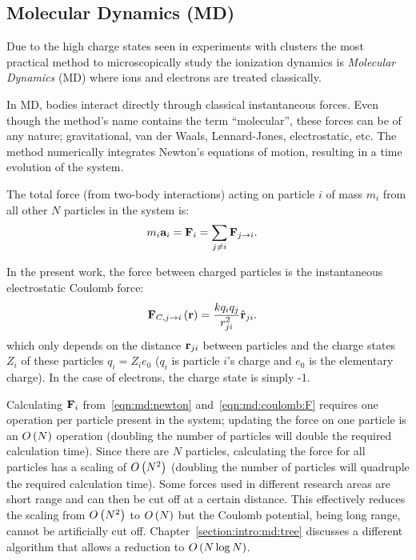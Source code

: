\subsection{Molecular Dynamics (MD)}
\label{section:tools:md}

Due to the high charge states seen in experiments with clusters the most
practical method to microscopically study the ionization dynamics is
\textit{Molecular Dynamics} (MD) where ions and electrons are treated
classically.

In MD, bodies interact directly through classical instantaneous forces. Even
though the method's name contains the term ``molecular'', these forces can be
of any nature; gravitational, van der Waals, Lennard-Jones, electrostatic, etc.
The method numerically integrates Newton's equations of motion, resulting in a
time evolution of the system.

The total force (from two-body interactions) acting on particle $i$ of mass
$m_i$ from all other $N$ particles in the system is:
\begin{align}
m_i \textbf{a}_i & = \textbf{F}_i = \sum_{j \ne i} \textbf{F}_{j \rightarrow i}.
\label{eqn:md:newton}
\end{align}

In the present work, the force between charged particles is the instantaneous
electrostatic Coulomb force:
\begin{align}
\textbf{F}_{C,j \rightarrow i}\left( \textbf{r} \right) & =\frac{k q_i q_j}{r_{ji}^2} \hat{\textbf{r}}_{ji}.
\label{eqn:md:coulomb:F}
\end{align}
which only depends on the distance $\textbf{r}_{ji}$ between particles and the charge
states $Z_i$ of these particles $q_i = Z_i e_0$ ($q_i$ is particle $i$'s charge
and $e_0$ is the elementary charge). In the case of electrons, the charge
state is simply -1.

Calculating $\textbf{F}_i$
from~\eqref{eqn:md:newton} and~\eqref{eqn:md:coulomb:F} requires one operation
per particle present in the system; updating the force on one particle is an
$O\left( N \right)$ operation (doubling the number of particles will double the required
calculation time). Since there are $N$ particles, calculating the force for
all particles has a scaling of $O\left( N^2 \right)$ (doubling the number of
particles will quadruple the required calculation time). Some forces used in
different research areas are short range and can then be cut off at a certain
distance. This effectively reduces the scaling from $O\left( N^2 \right)$ to $O\left( N \right)$
but the Coulomb potential, being long range, cannot be artificially cut off.
Chapter~\ref{section:intro:md:tree} discusses a different algorithm that allows
a reduction to $O\left( N \log{N} \right)$.


